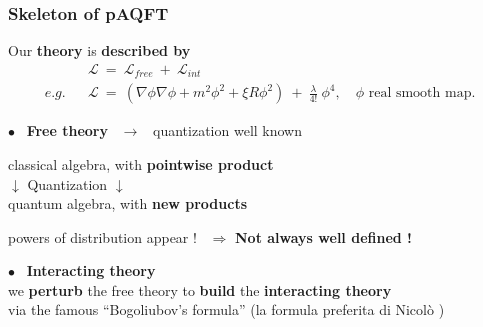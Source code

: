 \documentclass[9pt]{beamer}
\newcommand{\Lcal}{\mathcal{L}}
\begin{document}

\begin{frame}

\frametitle{Skeleton of pAQFT}

\vfill

Our \textbf{theory} is \textbf{described by}
\begin{eqnarray*}
&& \Lcal \ = \ \Lcal_{free} \ + \ \Lcal_{int} \\
e.g. && \Lcal \ = \ \left( \nabla \phi \nabla \phi + m^2 \phi^2 + \xi R \phi^2 \right) \ + \ \frac{\lambda}{4!} \ \phi^4 , \quad \phi \mbox{ real smooth map}.
\end{eqnarray*}

\vfill

$\bullet$ \ \textbf{Free theory} \ $\to$ \ quantization well known \\
\vspace*{-10pt}
\begin{block}{\vspace*{-3ex}}
\vspace*{-10pt}
\begin{center}
classical algebra, with \textbf{pointwise product} \\
$\downarrow$ Quantization $\downarrow$ \\
quantum algebra, with \textbf{new products} \\
\end{center}
\vspace*{-7pt}
\end{block}
\hspace*{8pt} powers of distribution appear !  \ $\Rightarrow$ \textbf{Not always well defined !} \\

\vfill

$\bullet$ \ \textbf{Interacting theory} \\

\hspace*{8pt} we \textbf{perturb} the free theory to \textbf{build} the \textbf{interacting theory} \\

\hspace*{8pt} via the famous ``Bogoliubov's formula'' (la formula preferita di Nicolò \smiley)\\ 

\vfill

\end{frame}
\end{document}
